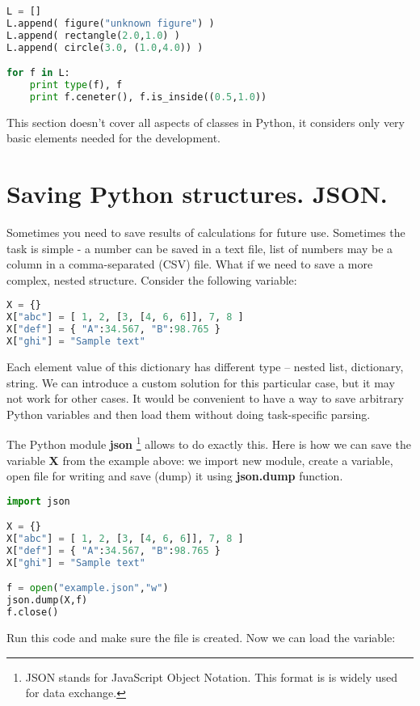 \begin{lstlisting}[language=Python,style=codelst2,caption={Python: using classes - 2}]
L = []
L.append( figure("unknown figure") )
L.append( rectangle(2.0,1.0) )
L.append( circle(3.0, (1.0,4.0)) )

for f in L:
    print type(f), f
    print f.ceneter(), f.is_inside((0.5,1.0))
\end{lstlisting}

This section doesn't cover all aspects of classes in Python, it
considers only very basic elements needed for the development.

\section{Saving Python structures. JSON.}

Sometimes you need to save results of calculations for future use.
Sometimes the task is simple - a number can be saved in a text file,
list of numbers may be a column in a comma-separated (CSV) file.
What if we need to save a more complex, nested structure.
Consider the following variable:

\begin{lstlisting}[language=Python,style=codelst2]
X = {}
X["abc"] = [ 1, 2, [3, [4, 6, 6]], 7, 8 ]
X["def"] = { "A":34.567, "B":98.765 }
X["ghi"] = "Sample text"
\end{lstlisting}
Each element value of this dictionary has different type -- nested list,
dictionary, string. We can introduce a custom solution for this particular
case, but it may not work for other cases. It would be convenient to have
a way to save arbitrary Python variables and then load them without
doing task-specific parsing.

The Python module \textbf{json} \footnote{JSON stands for
JavaScript Object Notation. This format is
is widely used for data exchange.}
allows to do exactly this.
Here is how we can save the variable \textbf{X} from the example above:
we import new module, create a variable, open file for writing
and save (dump) it using \textbf{json.dump} function.

\newpage

\begin{lstlisting}[language=Python,style=codelst2,caption={Python: save to JSON file}]
import json

X = {}
X["abc"] = [ 1, 2, [3, [4, 6, 6]], 7, 8 ]
X["def"] = { "A":34.567, "B":98.765 }
X["ghi"] = "Sample text"

f = open("example.json","w")
json.dump(X,f)
f.close()
\end{lstlisting}
Run this code and make sure the file is created.
Now we can load the variable:

